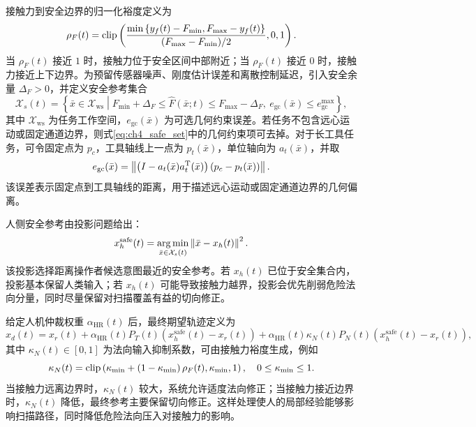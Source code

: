 接触力到安全边界的归一化裕度定义为
\begin{equation}
  \rho_F(t)=
  \operatorname{clip}\left(
  \frac{
  \min\left\{y_f(t)-F_{\min},F_{\max}-y_f(t)\right\}}
  {(F_{\max}-F_{\min})/2},
  0,1
  \right).
  \label{eq:ch4_force_margin}
\end{equation}
当 $\rho_F(t)$ 接近 $1$ 时，接触力位于安全区间中部附近；当 $\rho_F(t)$ 接近 $0$ 时，接触力接近上下边界。为预留传感器噪声、刚度估计误差和离散控制延迟，引入安全余量 $\Delta_F>0$，并定义安全参考集合
\begin{equation}
  \mathcal X_s(t)=
  \left\{
  \bar x\in\mathcal X_{\mathrm{ws}}
  \middle|
  F_{\min}+\Delta_F\le \hat F(\bar x;t)\le F_{\max}-\Delta_F,\
  e_{\mathrm{gc}}(\bar x)\le e_{\mathrm{gc}}^{\max}
  \right\},
  \label{eq:ch4_safe_set}
\end{equation}
其中 $\mathcal X_{\mathrm{ws}}$ 为任务工作空间，$e_{\mathrm{gc}}(\bar x)$ 为可选几何约束误差。若任务不包含远心运动或固定通道边界，则式\eqref{eq:ch4_safe_set}中的几何约束项可去掉。对于长工具任务，可令固定点为 $p_c$，工具轴线上一点为 $p_t(\bar x)$，单位轴向为 $a_t(\bar x)$，并取
\begin{equation}
  e_{\mathrm{gc}}(\bar x)=
  \left\|
  \left(I-a_t(\bar x)a_t^{\mathrm{T}}(\bar x)\right)
  \left(p_c-p_t(\bar x)\right)
  \right\|.
  \label{eq:ch4_gc_error}
\end{equation}
该误差表示固定点到工具轴线的距离，用于描述远心运动或固定通道边界的几何偏离。

人侧安全参考由投影问题给出：
\begin{equation}
  x_h^{\mathrm{safe}}(t)=
  \operatorname*{arg\,min}_{\bar x\in\mathcal X_s(t)}
  \left\lVert \bar x-x_h(t)\right\rVert^2 .
  \label{eq:ch4_safe_projection}
\end{equation}
该投影选择距离操作者候选意图最近的安全参考。若 $x_h(t)$ 已位于安全集合内，投影基本保留人类输入；若 $x_h(t)$ 可能导致接触力越界，投影会优先削弱危险法向分量，同时尽量保留对扫描覆盖有益的切向修正。

给定人机仲裁权重 $\alpha_{\mathrm{HR}}(t)$ 后，最终期望轨迹定义为
\begin{equation}
  x_d(t)=x_r(t)
  +\alpha_{\mathrm{HR}}(t)P_T(t)\left(x_h^{\mathrm{safe}}(t)-x_r(t)\right)
  +\alpha_{\mathrm{HR}}(t)\kappa_N(t)P_N(t)\left(x_h^{\mathrm{safe}}(t)-x_r(t)\right),
  \label{eq:ch4_final_reference}
\end{equation}
其中 $\kappa_N(t)\in[0,1]$ 为法向输入抑制系数，可由接触力裕度生成，例如
\begin{equation}
  \kappa_N(t)=
  \operatorname{clip}\left(\kappa_{\min}+\left(1-\kappa_{\min}\right)\rho_F(t),
  \kappa_{\min},1\right),
  \quad 0\le\kappa_{\min}\le1 .
  \label{eq:ch4_normal_gain}
\end{equation}
当接触力远离边界时，$\kappa_N(t)$ 较大，系统允许适度法向修正；当接触力接近边界时，$\kappa_N(t)$ 降低，最终参考主要保留切向修正。这样处理使人的局部经验能够影响扫描路径，同时降低危险法向压入对接触力的影响。

